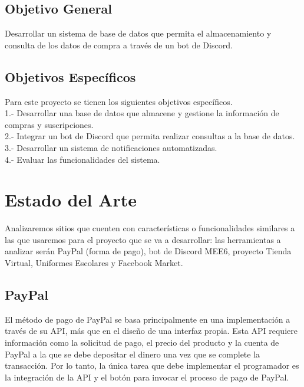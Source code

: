 \documentclass[a4paper,12pt]{article}
\begin{document}
\subsection{Objetivo General}
 Desarrollar un sistema de base de datos que permita el almacenamiento y consulta de los datos de compra a través de un bot de Discord. \\

\subsection{Objetivos Específicos}
Para este proyecto se tienen los siguientes objetivos específicos. \\

1.-  Desarrollar una base de datos que almacene y gestione la información de compras y suscripciones.\\

2.- Integrar un bot de Discord que permita realizar consultas a la base de datos.\\

3.- Desarrollar un sistema de notificaciones automatizadas.\\

4.- Evaluar las funcionalidades del sistema.\\

\newpage

\section{Estado del Arte}
Analizaremos sitios que cuenten con características o funcionalidades similares a las que usaremos para el proyecto que se va a desarrollar: las herramientas a analizar serán PayPal (forma de pago), bot de Discord MEE6, proyecto Tienda Virtual, Uniformes Escolares y Facebook Market.\\

\subsection{PayPal}

El método de pago de PayPal se basa principalmente en una implementación a través de su API, más que en el diseño de una interfaz propia. Esta API requiere información como la solicitud de pago, el precio del producto y la cuenta de PayPal a la que se debe depositar el dinero una vez que se complete la transacción. Por lo tanto, la única tarea que debe implementar el programador es la integración de la API y el botón para invocar el proceso de pago de PayPal.\\
\end{document}
